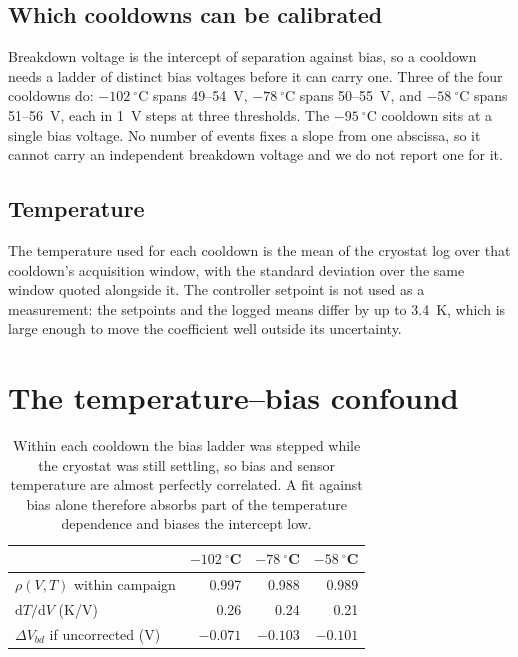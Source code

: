 \documentclass[10pt,twocolumn]{article}
\begin{document}
\subsection{Which cooldowns can be calibrated}

Breakdown voltage is the intercept of separation against bias, so a cooldown
needs a ladder of distinct bias voltages before it can carry one. Three of the
four cooldowns do: $-102~^\circ$C spans 49--54~V,
$-78~^\circ$C spans 50--55~V, and $-58~^\circ$C spans
51--56~V, each in 1~V steps at three thresholds. The
$-95~^\circ$C cooldown sits at a single bias voltage. No number of events fixes
a slope from one abscissa, so it cannot carry an independent breakdown voltage
and we do not report one for it.

\subsection{Temperature}

The temperature used for each cooldown is the mean of the cryostat log over
that cooldown's acquisition window, with the standard deviation over the same
window quoted alongside it. The controller setpoint is not used as a
measurement: the setpoints and the logged means differ by up to
3.4~K, which is large enough to move the coefficient well outside
its uncertainty.

\section{The temperature--bias confound}

\begin{table}[t]
\centering
\small
\begin{tabular}{lrrr}
\toprule
 & $-102~^\circ$C & $-78~^\circ$C & $-58~^\circ$C \\
\midrule
$\rho(V, T)$ within campaign & 0.997 & 0.988 & 0.989 \\
$\mathrm{d}T/\mathrm{d}V$ (K/V) & 0.26 & 0.24 & 0.21 \\
$\Delta V_{bd}$ if uncorrected (V) & $-0.071$ & $-0.103$ & $-0.101$ \\
\bottomrule
\end{tabular}
\caption{Within each cooldown the bias ladder was stepped while the cryostat
was still settling, so bias and sensor temperature are almost perfectly
correlated. A fit against bias alone therefore absorbs part of the temperature
dependence and biases the intercept low.}
\label{tab:confound}
\end{table}
\end{document}
